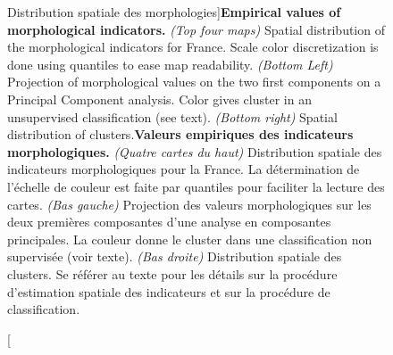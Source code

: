 \begin{figure}
\caption[Empirical values of morphological indicators][Distribution spatiale des morphologies]{\textbf{Empirical values of morphological indicators.} \textit{(Top four maps)} Spatial distribution of the morphological indicators for France. Scale color discretization is done using quantiles to ease map readability. \textit{(Bottom Left)} Projection of morphological values on the two first components on a Principal Component analysis. Color gives cluster in an unsupervised classification (see text). \textit{(Bottom right)} Spatial distribution of clusters.\label{fig:staticcorrelations:empirical}}{\textbf{Valeurs empiriques des indicateurs morphologiques.} \textit{(Quatre cartes du haut)} Distribution spatiale des indicateurs morphologiques pour la France. La détermination de l'échelle de couleur est faite par quantiles pour faciliter la lecture des cartes. \textit{(Bas gauche)} Projection des valeurs morphologiques sur les deux premières composantes d'une analyse en composantes principales. La couleur donne le cluster dans une classification non supervisée (voir texte). \textit{(Bas droite)} Distribution spatiale des clusters. Se référer au texte pour les détails sur la procédure d'estimation spatiale des indicateurs et sur la procédure de classification.\label{fig:staticcorrelations:empirical}}
\end{figure}



